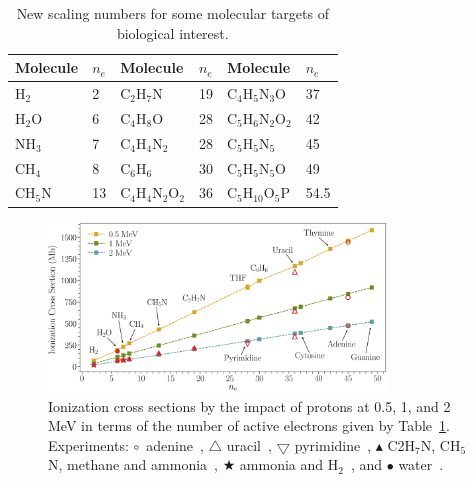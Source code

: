 \documentclass[preprint,showpacs]{revtex4}
\begin{document}
\begin{table}[H]
\begin{center}
\begin{tabular}{|ll|ll|ll|}
\hline
 Molecule & $n_e$ &Molecule          & $n_e$ & Molecule             & $n_e$\\
\hline
 H$_2$    & 2  & C$_2$H$_7$N         & 19    & C$_4$H$_5$N$_3$O     & 37   \\
 H$_2$O   & 6  & C$_4$H$_8$O         & 28    & C$_5$H$_6$N$_2$O$_2$ & 42   \\
 NH$_3$   & 7  & C$_4$H$_4$N$_2$     & 28    & C$_5$H$_5$N$_5$      & 45   \\
 CH$_4$   & 8  & C$_6$H$_6$          & 30    & C$_5$H$_5$N$_5$O     & 49   \\
 CH$_5$N  & 13 & C$_4$H$_4$N$_2$O$_2$& 36    & C$_5$H$_{10}$O$_5$P  & 54.5 \\
 \hline
\end{tabular}
\caption{New scaling numbers for some molecular targets of biological 
interest.}
\label{nn}
\end{center}
\end{table}

\begin{figure}[t!]
\centering
\includegraphics[width=0.8\textwidth]{figuras/scale_ne.eps}
\caption{Ionization cross sections by the impact of protons at 0.5, 1,
and 2 MeV in terms of the number of active electrons given by Table~\ref{nn}.
Experiments: 
\mbox{\Large$\circ$}~adenine~\cite{iriki2011}, 
$\triangle$ uracil~\cite{itoh2013}, 
$\bigtriangledown$ pyrimidine~\cite{wolff2014}, 
$\blacktriangle$ C2H$_7$N, CH$_5$N, methane and ammonia~\cite{lynch1976},
\mbox{\scriptsize$\bigstar$} ammonia and H$_2$~\cite{rudd1985}, and 
\mbox{\Large$\bullet$} water~\cite{luna2007}.}
\label{fig:recta}
\end{figure}
\end{document}
